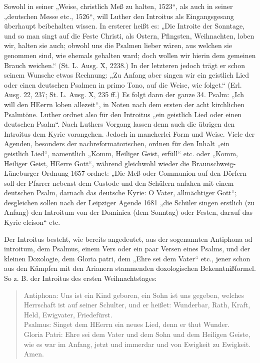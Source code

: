 Sowohl in seiner „Weise, christlich Meß zu halten, 1523“, als auch in seiner „deutschen Messe etc., 1526“, will Luther den Introitus als Eingangsgesang überhaupt beibehalten wissen. In ersterer heißt es: „Die Introite der Sonntage, und so man singt auf die Feste Christi, als Ostern, Pfingsten, Weihnachten, loben wir, halten sie auch; obwohl uns die Psalmen lieber wären, aus welchen sie genommen sind, wie ehemals gehalten ward; doch wollen wir hierin dem gemeinen Brauch weichen.“ (St. L. Ausg. X, 2238.) In der letzteren jedoch trägt er schon seinem Wunsche etwas Rechnung: „Zu Anfang aber singen wir ein geistlich Lied oder einen deutschen Psalmen in primo Tono, auf die Weise, wie folget.“ (Erl. Ausg. 22, 237; St. L. Ausg. X, 235 ff.) Es folgt dann der ganze 34. Psalm: „Ich will
den HEerrn loben allezeit“, in Noten nach dem ersten der acht kirchlichen Psalmtöne. Luther ordnet also für den Introitus „ein geistlich Lied oder einen deutschen Psalm“. Nach Luthers Vorgang lassen denn auch die übrigen den Introitus dem Kyrie vorangehen. Jedoch in mancherlei Form und Weise. Viele der Agenden, besonders der nachreformatorischen, ordnen für den Inhalt „ein geistlich Lied“, namentlich „Komm, Heiliger Geist, erfüll“ etc. oder „Komm, Heiliger Geist, HEerre Gott“, während gleichwohl wieder die Braunschweig-Lüneburger Ordnung 1657 ordnet: „Die Meß oder Communion auf den Dörfern soll der Pfarrer nebenst dem Custode und den Schülern anfahen mit einem deutschen Psalm, darnach das deutsche Kyrie: O Vater, allmächtiger Gott“; desgleichen sollen nach der Leipziger Agende 1681 „die Schüler singen erstlich (zu Anfang) den Introitum von der Dominica (dem Sonntag) oder Festen, darauf das Kyrie eleison“ etc.

Der Introitus besteht, wie bereits angedeutet, aus der sogenannten Antiphona ad introitum, dem Psalmus, einem Vers oder ein paar Versen eines Psalms, und der kleinen Doxologie, dem Gloria patri, dem „Ehre sei dem Vater“ etc., jener schon aus den Kämpfen mit den Arianern stammenden doxologischen Bekenntnißformel. So z. B. der Introitus des ersten Weihnachtstages:

\begin{verse}
Antiphona: Uns ist ein Kind geboren, ein Sohn ist uns gegeben, welches Herrschaft ist auf seiner Schulter, und er heißet: Wunderbar, Rath, Kraft, Held, Ewigvater, Friedefürst.\\
Psalmus: Singet dem HEerrn ein neues Lied, denn er thut Wunder.\\
Gloria Patri: Ehre sei dem Vater und dem Sohn und dem Heiligen Geiste, wie es war im Anfang, jetzt und immerdar und von Ewigkeit zu Ewigkeit. Amen.
\end{verse}

